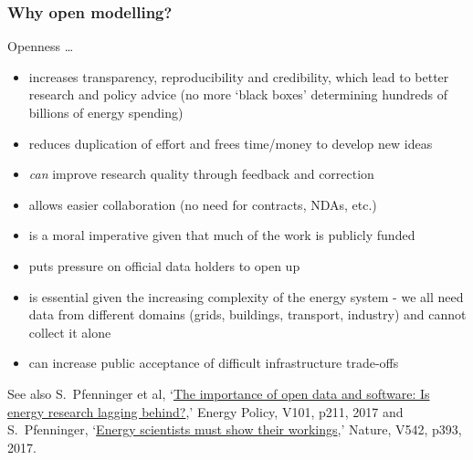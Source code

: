 \documentclass[10pt,aspectratio=169,dvipsnames]{beamer}
\let\olditem\item
\renewcommand{\item}{%
\olditem\vspace{5pt}}
\begin{document}
\begin{frame}
  \frametitle{Why open modelling?}

  Openness \dots
  \begin{itemize}
  \item increases \alert{transparency}, \alert{reproducibility}
    and \alert{credibility}, which lead to better research and policy
    advice  (no more `black boxes' determining hundreds of billions of energy spending)
  \item  reduces
    \alert{duplication of effort} and frees time/money  to develop
    \alert{new ideas}
  \item \emph{can} improve research \alert{quality} through feedback and correction
  \item allows easier \alert{collaboration} (no need for contracts, NDAs, etc.)
  \item is a \alert{moral imperative} given that much of the work is publicly funded
  \item puts pressure on \alert{official data holders} to open up
  \item is essential given the increasing \alert{complexity} of the energy system - we all need data from different domains (grids, buildings, transport, industry) and cannot collect it alone
  \item can increase \alert{public acceptance} of difficult infrastructure trade-offs
  \end{itemize}
  {\tiny See also  S.~Pfenninger et al, `\href{https://doi.org/10.1016/j.enpol.2016.11.046}{The importance of open data and software: Is energy research lagging behind?},' Energy Policy, V101, p211, 2017 and S.~Pfenninger, `\href{https://dx.doi.org/10.1038/542393a}{Energy scientists must show their workings},' Nature, V542, p393, 2017.}


\end{frame}
\end{document}
